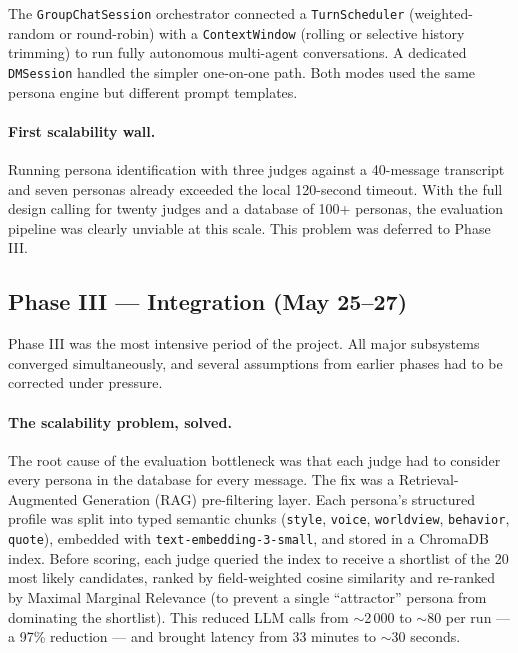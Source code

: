 \documentclass[12pt,a4paper]{article}
\begin{document}
The \texttt{GroupChatSession} orchestrator connected a \texttt{TurnScheduler} (weighted-random
or round-robin) with a \texttt{ContextWindow} (rolling or selective history trimming) to run
fully autonomous multi-agent conversations. A dedicated \texttt{DMSession} handled the simpler
one-on-one path. Both modes used the same persona engine but different prompt templates.

\paragraph{First scalability wall.}
Running persona identification with three judges against a 40-message transcript and seven
personas already exceeded the local 120-second timeout. With the full design calling for twenty
judges and a database of 100+ personas, the evaluation pipeline was clearly unviable at this
scale. This problem was deferred to Phase III.

\subsection{Phase III --- Integration (May 25--27)}

Phase III was the most intensive period of the project. All major subsystems converged
simultaneously, and several assumptions from earlier phases had to be corrected under pressure.

\paragraph{The scalability problem, solved.}
The root cause of the evaluation bottleneck was that each judge had to consider every persona
in the database for every message. The fix was a Retrieval-Augmented Generation (RAG)
pre-filtering layer. Each persona's structured profile was split into typed semantic chunks
(\texttt{style}, \texttt{voice}, \texttt{worldview}, \texttt{behavior}, \texttt{quote}),
embedded with \texttt{text-embedding-3-small}, and stored in a ChromaDB index. Before scoring,
each judge queried the index to receive a shortlist of the 20 most likely candidates, ranked by
field-weighted cosine similarity and re-ranked by Maximal Marginal Relevance (to prevent a
single ``attractor'' persona from dominating the shortlist). This reduced LLM calls from
$\sim$2\,000 to $\sim$80 per run --- a 97\% reduction --- and brought latency from 33 minutes
to $\sim$30 seconds.
\end{document}
